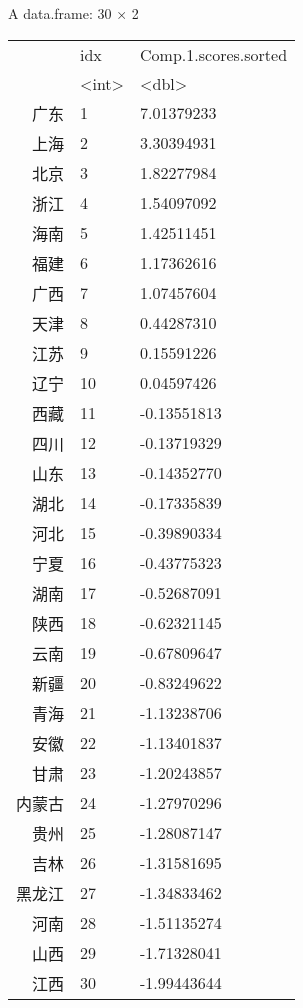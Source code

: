\documentclass[11pt]{article}
\begin{document}
    A data.frame: 30 × 2
\begin{tabular}{r|ll}
  & idx & Comp.1.scores.sorted\\
  & <int> & <dbl>\\
\hline
	广东 &  1 &  7.01379233\\
	上海 &  2 &  3.30394931\\
	北京 &  3 &  1.82277984\\
	浙江 &  4 &  1.54097092\\
	海南 &  5 &  1.42511451\\
	福建 &  6 &  1.17362616\\
	广西 &  7 &  1.07457604\\
	天津 &  8 &  0.44287310\\
	江苏 &  9 &  0.15591226\\
	辽宁 & 10 &  0.04597426\\
	西藏 & 11 & -0.13551813\\
	四川 & 12 & -0.13719329\\
	山东 & 13 & -0.14352770\\
	湖北 & 14 & -0.17335839\\
	河北 & 15 & -0.39890334\\
	宁夏 & 16 & -0.43775323\\
	湖南 & 17 & -0.52687091\\
	陕西 & 18 & -0.62321145\\
	云南 & 19 & -0.67809647\\
	新疆 & 20 & -0.83249622\\
	青海 & 21 & -1.13238706\\
	安徽 & 22 & -1.13401837\\
	甘肃 & 23 & -1.20243857\\
	内蒙古 & 24 & -1.27970296\\
	贵州 & 25 & -1.28087147\\
	吉林 & 26 & -1.31581695\\
	黑龙江 & 27 & -1.34833462\\
	河南 & 28 & -1.51135274\\
	山西 & 29 & -1.71328041\\
	江西 & 30 & -1.99443644\\
\end{tabular}


    

    
    
    
\end{document}

